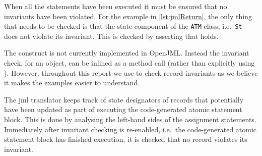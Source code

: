 When all the statements have been executed it must be ensured that no
invariants have been violated. For the example in
\autoref{lst:jmlReturn}, the only thing that needs to be checked is
that the state component of the \texttt{ATM} class, i.e.\ \texttt{St}
does not violate its invariant. This is checked by asserting that
 holds.


%
%

The \invariantfor construct is not currently implemented in
OpenJML. Instead the invariant check, for an object, can be inlined as
a method call (rather than explicitly using \invariantfor). However,
throughout this report we use \invariantfor to check record invariants
as we believe it makes the examples easier to understand.

The \ac{jml} translator keeps track of state designators of records
that potentially have been updated as part of executing the
code-generated atomic statement block. This is done by analysing the
left-hand sides of the assignment statements. Immediately after
invariant checking is re-enabled, i.e.\ the code-generated atomic
statement block has finished execution, it is checked that no record
violates its invariant.

